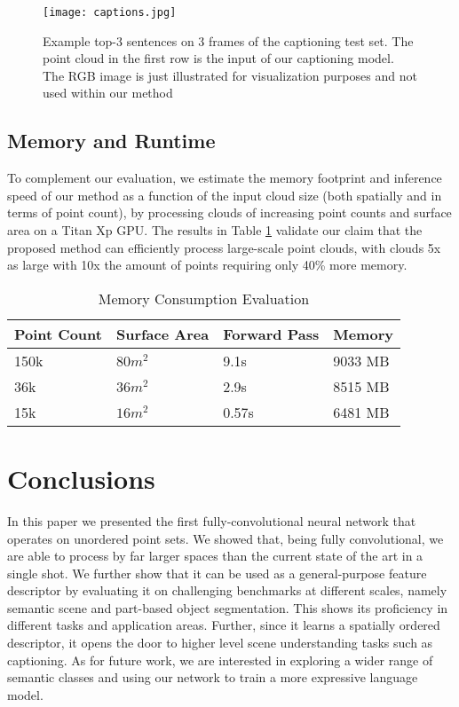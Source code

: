 \documentclass[runningheads]{llncs}
\begin{document}
\begin{figure}[t]
    \centering
 \texttt{[image: captions.jpg]} 
    \caption{Example top-3 sentences on 3 frames of the captioning test set. The point cloud in the first row is the input of our captioning model. The RGB image is just illustrated for visualization purposes and not used within our method}
    \label{fig:captiong_result} 
\end{figure}

\subsection{Memory and Runtime}

To complement our evaluation, we estimate the memory footprint and inference speed of our method as a function of the input cloud size (both spatially and in terms of point count), by processing clouds of increasing point counts and surface area on a Titan Xp GPU. The results in Table \ref{table:runtime} validate our claim that the proposed method can efficiently process large-scale point clouds, with clouds 5x as large with 10x the amount of points requiring only 40\% more memory.

\begin{table}[h]
\setlength{\tabcolsep}{1em}
\centering
\caption{Memory Consumption Evaluation}
\label{table:runtime}{%
{\renewcommand{\arraystretch}{1.1}%
\begin{tabular}{l l l l}
\textbf{Point Count} & \textbf{Surface Area} & \textbf{Forward Pass} & \textbf{Memory} \\
\hline
150k & $80m^2$ & 9.1s & 9033 MB\\
36k & $36m^2$ & 2.9s & 8515 MB\\
15k & $16m^2$ & 0.57s & 6481 MB\\                 
\end{tabular}}}
\end{table}

\section{Conclusions}

In this paper we presented the first fully-convolutional neural network that operates on unordered point sets. We showed that, being fully convolutional, we are able to process by far larger spaces than the current state of the art in a single shot. We further show that it can be used as a general-purpose feature descriptor by evaluating it on challenging benchmarks at different scales, namely semantic scene and part-based object segmentation. This shows its proficiency in different tasks and application areas. Further, since it learns a spatially ordered descriptor, it opens the door to higher level scene understanding tasks such as captioning. As for future work, we are interested in exploring a wider range of semantic classes and using our network to train a more expressive language model.



\end{document}
